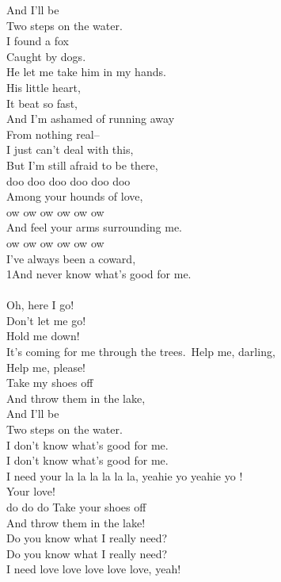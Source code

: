   And I'll be\\
  Two steps on the water.\\
  I found a fox\\
  Caught by dogs.\\
  He let me take him in my hands.\\
  His little heart,\\
  It beat so fast,\\
  And I'm ashamed of running away\\
  From nothing real--\\
  I just can't deal with this,\\
  But I'm still afraid to be there,\\
  doo doo doo doo doo doo\\
  Among your hounds of love,\\
  ow ow ow ow ow ow\\
  And feel your arms surrounding me.\\
  ow ow ow ow ow ow\\
  I've always been a coward,\\
  1And never know what's good for me.\\
  \\
  Oh, here I go!\\
  Don't let me go!\\
  Hold me down!\\
  It's coming for me through the trees.\
  Help me, darling,\\
  Help me, please!\\
  Take my shoes off\\
  And throw them in the \upchord{Bb}lake,\\
  And I'll be\\
  Two steps on the water.\\
  I don't know what's \upchord{F}good for me.\\
  I don't know what's good for me.\\
  I need your la la la la la la, yeahie yo yeahie yo !\\
  \upchord{Bb}Your love!\\
  do do do
  Take your shoes off\\
  And throw them in the lake!\\
  Do you know what I \upchord{F}really need?\\
  Do you know what I really need?\\
  I need \upchord{Bb}love love love love love, yeah!\\
